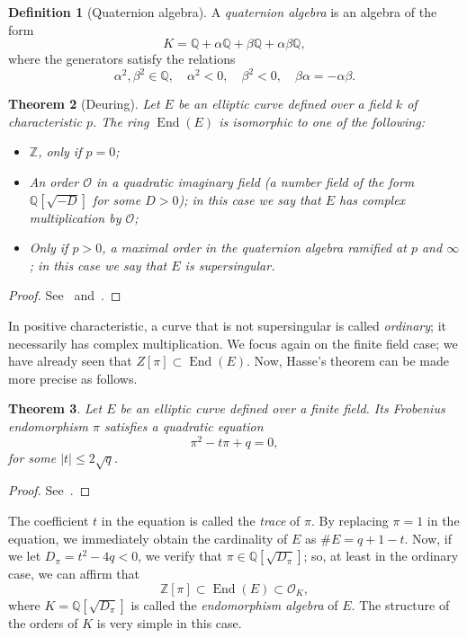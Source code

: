 \documentclass[10pt]{article}
\theoremstyle{plain}
\newtheorem{theorem}{Theorem}
\theoremstyle{definition}
\newtheorem{definition}[theorem]{Definition}
\DeclareMathOperator{\End}{End} %
\def\O{\ensuremath{\mathcal{O}}}
\begin{document}
\begin{definition}[Quaternion algebra]
  A \emph{quaternion algebra} is an algebra of the form
  \[K = ℚ + αℚ + βℚ + αβℚ,\]
  where the generators satisfy the relations
  \[α^2,β^2∈ℚ, \quad α^2<0, \quad β^2 < 0, \quad βα=-αβ.\]
\end{definition}

\begin{theorem}[Deuring]
  Let $E$ be an elliptic curve defined over a field $k$ of
  characteristic $p$. %
  The ring $\End(E)$ is isomorphic to one of the following:
  \begin{itemize}
  \item $ℤ$, only if $p=0$;
  \item An order $\O$ in a quadratic imaginary field (a number field
    of the form $ℚ[\sqrt{-D}]$ for some $D>0$); in this case we say
    that $E$ has \emph{complex multiplication} by $\O$;
  \item Only if $p>0$, a maximal order in the quaternion algebra
    ramified at $p$ and $∞$; in this case we say that $E$ is
    \emph{supersingular}.
  \end{itemize}
\end{theorem}
\begin{proof}
  See~\cite[III, Coro.~9.4]{silverman:elliptic}
  and~\cite{belding08-thesis}.
\end{proof}

In positive characteristic, a curve that is not supersingular is
called \emph{ordinary}; it necessarily has complex multiplication. %
We focus again on the finite field case; we have already seen that
$Ζ[π]⊂\End(E)$. %
Now, Hasse's theorem can be made more precise as follows.

\begin{theorem}
  Let $E$ be an elliptic curve defined over a finite field. %
  Its Frobenius endomorphism $π$ satisfies a quadratic equation
  \[π^2 - tπ + q = 0,\]
  for some $|t|≤2\sqrt{q}$.
\end{theorem}
\begin{proof}
  See~\cite[V, Th.~2.3.1]{silverman:elliptic}.
\end{proof}

The coefficient $t$ in the equation is called the \emph{trace} of
$π$. %
By replacing $π=1$ in the equation, we immediately obtain the
cardinality of $E$ as $\#E = q+1-t$. %
Now, if we let $D_π=t^2-4q<0$, we verify that $π∈ℚ[\sqrt{D_π}]$; so,
at least in the ordinary case, we can affirm that
\[ℤ[π] ⊂ \End(E) ⊂ \O_K,\] %
where $K=ℚ[\sqrt{D_π}]$ is called the \emph{endomorphism algebra} of
$E$. %
The structure of the orders of $K$ is very simple in this case.
\end{document}
